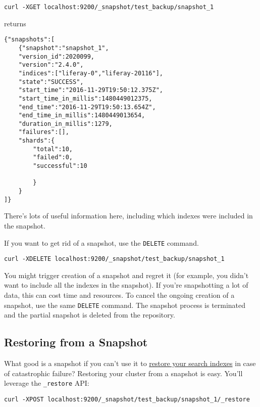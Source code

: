 \begin{verbatim}
curl -XGET localhost:9200/_snapshot/test_backup/snapshot_1
\end{verbatim}

returns

\begin{verbatim}
{"snapshots":[
    {"snapshot":"snapshot_1",
    "version_id":2020099,
    "version":"2.4.0",
    "indices":["liferay-0","liferay-20116"],
    "state":"SUCCESS",
    "start_time":"2016-11-29T19:50:12.375Z",
    "start_time_in_millis":1480449012375,
    "end_time":"2016-11-29T19:50:13.654Z",
    "end_time_in_millis":1480449013654,
    "duration_in_millis":1279,
    "failures":[],
    "shards":{
        "total":10,
        "failed":0,
        "successful":10

        }
    }
]}
\end{verbatim}

There's lots of useful information here, including which indexes were
included in the snapshot.

If you want to get rid of a snapshot, use the \texttt{DELETE} command.

\begin{verbatim}
curl -XDELETE localhost:9200/_snapshot/test_backup/snapshot_1
\end{verbatim}

You might trigger creation of a snapshot and regret it (for example, you
didn't want to include all the indexes in the snapshot). If you're
snapshotting a lot of data, this can cost time and resources. To cancel
the ongoing creation of a snapshot, use the same \texttt{DELETE}
command. The snapshot process is terminated and the partial snapshot is
deleted from the repository.

\subsection{Restoring from a
Snapshot}\label{restoring-from-a-snapshot}

What good is a snapshot if you can't use it to
\href{https://www.elastic.co/guide/en/elasticsearch/guide/current/_restoring_from_a_snapshot.html}{restore
your search indexes} in case of catastrophic failure? Restoring your
cluster from a snapshot is easy. You'll leverage the \texttt{\_restore}
API:

\begin{verbatim}
curl -XPOST localhost:9200/_snapshot/test_backup/snapshot_1/_restore
\end{verbatim}

